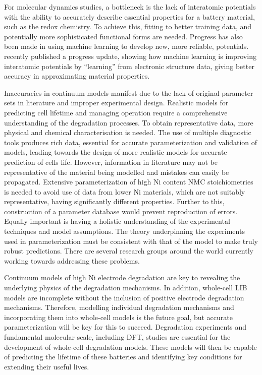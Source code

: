 \documentclass[journal=jacsat,manuscript=article]{achemso}
\begin{document}
For molecular dynamics studies, a bottleneck is the lack of interatomic potentials with the ability to accurately describe essential properties for a battery material, such as the redox chemistry.
To achieve this, fitting to better training data, and potentially more sophisticated functional forms are needed.
Progress has also been made in using machine learning to develop new, more reliable, potentials. \citeauthor{deringer2019machine} recently published a progress update, showing how machine learning is improving interatomic potentials by ``learning'' from electronic structure data, giving better accuracy in approximating material properties.\cite{deringer2019machine}

Inaccuracies in continuum models manifest due to the lack of original parameter sets in literature and improper experimental design.
Realistic models for predicting cell lifetime and managing operation require a comprehensive understanding of the degradation processes.
To obtain representative data, more physical and chemical characterisation is needed.
The use of multiple diagnostic tools produces rich data, essential for accurate parameterization and validation of models, leading towards the design of more realistic models for accurate prediction of cells life.
However, information in literature may not be representative of the material being modelled and mistakes can easily be propagated.\cite{Howey_2020}
Extensive parameterization of high Ni content NMC stoichiometries is needed to avoid use of data from lower Ni materials, which are not suitably representative, having significantly different properties.
Further to this, construction of a parameter database would prevent reproduction of errors.
Equally important is having a holistic understanding of the experimental techniques and model assumptions.
The theory underpinning the experiments used in parameterization must be consistent with that of the model to make truly robust predictions.
There are several research groups around the world currently working towards addressing these problems.

Continuum models of high Ni electrode degradation are key to revealing the underlying physics of the degradation mechanisms.
In addition, whole-cell LIB models are incomplete without the inclusion of positive electrode degradation mechanisms.
Therefore, modelling individual degradation mechanisms and incorporating them into whole-cell models is the future goal, but accurate parameterization will be key for this to succeed.
Degradation experiments and fundamental molecular scale, including DFT, studies are essential for the development of whole-cell degradation models.\cite{Sulzer_2020}
These models will then be capable of predicting the lifetime of these batteries and identifying key conditions for extending their useful lives.
\end{document}
